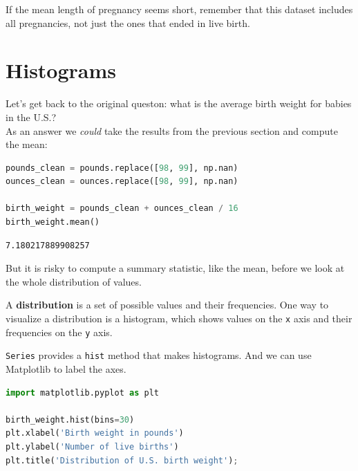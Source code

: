 If the mean length of pregnancy seems short, remember that this dataset
includes all pregnancies, not just the ones that ended in live birth.

\hypertarget{histograms}{%
\section{Histograms}\label{histograms}}

Let's get back to the original queston: what is the average birth weight
for babies in the U.S.?\\
As an answer we \emph{could} take the results from the previous section
and compute the mean:

\begin{lstlisting}[language=Python]
pounds_clean = pounds.replace([98, 99], np.nan)
ounces_clean = ounces.replace([98, 99], np.nan)

birth_weight = pounds_clean + ounces_clean / 16
birth_weight.mean()
\end{lstlisting}

\begin{lstlisting}[]
7.180217889908257
\end{lstlisting}

But it is risky to compute a summary statistic, like the mean, before we
look at the whole distribution of values.

A \textbf{distribution} is a set of possible values and their
frequencies. One way to visualize a distribution is a histogram, which
shows values on the \passthrough{\lstinline!x!} axis and their
frequencies on the \passthrough{\lstinline!y!} axis.

\passthrough{\lstinline!Series!} provides a
\passthrough{\lstinline!hist!} method that makes histograms. And we can
use Matplotlib to label the axes.

\begin{lstlisting}[language=Python]
import matplotlib.pyplot as plt

birth_weight.hist(bins=30)
plt.xlabel('Birth weight in pounds')
plt.ylabel('Number of live births')
plt.title('Distribution of U.S. birth weight');
\end{lstlisting}

